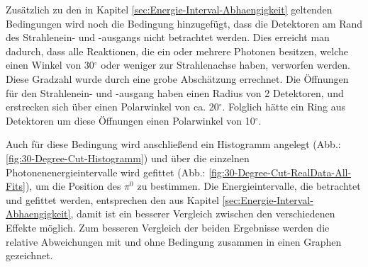\documentclass[a4paper,11pt,oneside,final,german,openbib,pdftex]{scrbook}
\begin{document}
{%


Zus\"atzlich zu den in Kapitel \ref{sec:Energie-Interval-Abhaengigkeit} geltenden Bedingungen wird noch die Bedingung hinzugef\"ugt, dass die Detektoren am Rand des Strahlenein- und -ausgangs nicht betrachtet werden. Dies erreicht man dadurch, dass alle Reaktionen, die ein oder mehrere Photonen besitzen, welche einen Winkel von 30$^{\circ}$ oder weniger zur Strahlenachse haben, verworfen werden. Diese Gradzahl wurde durch eine grobe Absch\"atzung errechnet. Die \"Offnungen f\"ur den Strahlenein- und -ausgang haben einen Radius von 2 Detektoren, und erstrecken sich \"uber einen Polarwinkel von ca. 20$^{\circ}$. Folglich h\"atte ein Ring aus Detektoren um diese \"Offnungen einen Polarwinkel von 10$^{\circ}$. 
 
Auch f\"ur diese Bedingung wird anschlie{\ss}end ein Histogramm angelegt (Abb.: \ref{fig:30-Degree-Cut-Histogramm}) und über die einzelnen Photonenenergieintervalle wird gefittet (Abb.: \ref{fig:30-Degree-Cut-RealData-All-Fits}), um die Position des $\pi^0$ zu bestimmen. Die Energieintervalle, die betrachtet und gefittet werden, entsprechen den aus Kapitel \ref{sec:Energie-Interval-Abhaengigkeit}, damit ist ein besserer Vergleich zwischen den verschiedenen Effekte m\"oglich.
Zum besseren Vergleich der beiden Ergebnisse werden die relative Abweichungen mit und ohne Bedingung zusammen in einen Graphen gezeichnet.

}
\end{document}
